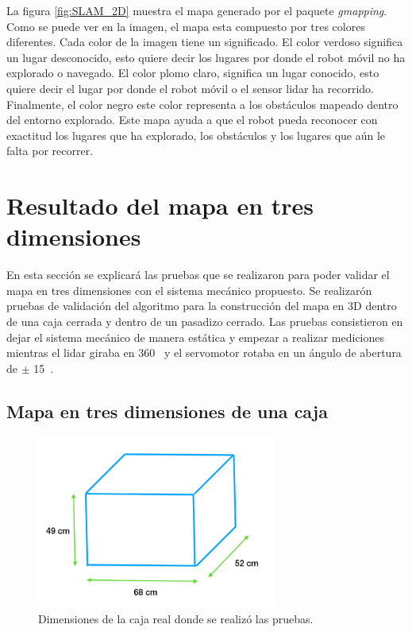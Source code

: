 La figura \ref{fig:SLAM_2D} muestra el mapa generado por el paquete \textit{gmapping}. Como 
se puede ver en la imagen, el mapa esta compuesto por tres colores diferentes. Cada color 
de la imagen tiene un significado. El color verdoso significa un lugar desconocido, esto 
quiere decir los lugares por donde el robot móvil no ha explorado o navegado. El color 
plomo claro, significa un lugar conocido, esto quiere decir el lugar por donde el robot 
móvil o el sensor lidar ha recorrido. Finalmente, el color negro este color representa a 
los obstáculos mapeado dentro del entorno explorado. Este mapa ayuda a que el robot pueda 
reconocer con exactitud los lugares que ha explorado, los obstáculos y los lugares que aún 
le falta por recorrer.

\section{Resultado del mapa en tres dimensiones}
En esta sección se explicará las pruebas que se realizaron para poder validar el mapa en 
tres dimensiones con el sistema mecánico propuesto. Se realizarón pruebas de validación 
del algoritmo para la construcción del mapa en 3D dentro de una caja cerrada y dentro de 
un pasadizo cerrado. Las pruebas consistieron en dejar el sistema mecánico de manera 
estática y empezar a realizar mediciones mientras el lidar giraba en 360\grad~ y el 
servomotor rotaba en un ángulo de abertura de $\pm$ 15\grad~.

\subsection{Mapa en tres dimensiones de una caja}
\label{sec:MapaCaja}
\begin{figure}
  \centering \footnotesize
  \includegraphics[width=0.70\textwidth]{images/dimensiones_caja.png}
  \captionsetup{font=footnotesize}
  \caption{Dimensiones de la caja real donde se realizó las pruebas.}
  \label{fig:dim_cajaReal}
\end{figure}

